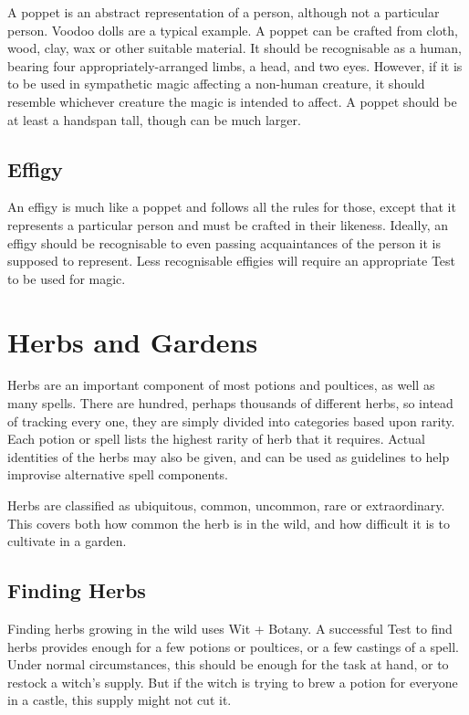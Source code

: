 A poppet is an abstract representation of a person, although not a particular person.
Voodoo dolls are a typical example.
A poppet can be crafted from cloth, wood, clay, wax or other suitable material.
It should be recognisable as a human, bearing four appropriately-arranged limbs, a head, and two eyes.
However, if it is to be used in sympathetic magic affecting a non-human creature, it should resemble whichever creature the magic is intended to affect.
A poppet should be at least a handspan tall, though can be much larger.

\subsection{Effigy}

An effigy is much like a poppet and follows all the rules for those, except that it represents a particular person and must be crafted in their likeness.
Ideally, an effigy should be recognisable to even passing acquaintances of the person it is supposed to represent.
Less recognisable effigies will require an appropriate Test to be used for magic.



\section{Herbs and Gardens}

Herbs are an important component of most potions and poultices, as well as many spells.
There are hundred, perhaps thousands of different herbs, so intead of tracking every one, they are simply divided into categories based upon rarity.
Each potion or spell lists the highest rarity of herb that it requires.
Actual identities of the herbs may also be given, and can be used as guidelines to help improvise alternative spell components.

Herbs are classified as ubiquitous, common, uncommon, rare or extraordinary.
This covers both how common the herb is in the wild, and how difficult it is to cultivate in a garden.

\subsection{Finding Herbs}

Finding herbs growing in the wild uses Wit + Botany.
A successful Test to find herbs provides enough for a few potions or poultices, or a few castings of a spell.
Under normal circumstances, this should be enough for the task at hand, or to restock a witch's supply.
But if the witch is trying to brew a potion for everyone in a castle, this supply might not cut it.

